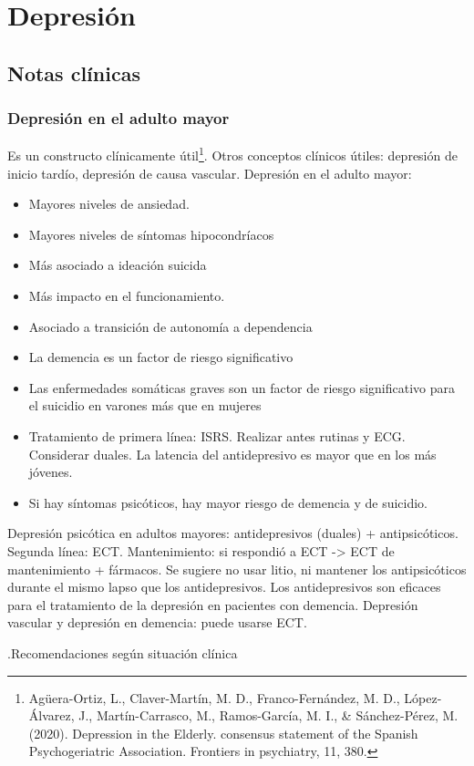 \chapter{Depresión}
\section*{Notas clínicas}
\subsection*{Depresión en el adulto mayor}
Es un constructo clínicamente útil\footnote{Agüera-Ortiz, L., Claver-Martín, M. D., Franco-Fernández, M. D., López-Álvarez, J., Martín-Carrasco, M., Ramos-García, M. I., \& Sánchez-Pérez, M. (2020). Depression in the Elderly. consensus statement of the Spanish Psychogeriatric Association. Frontiers in psychiatry, 11, 380.}.
Otros conceptos clínicos útiles: depresión de inicio tardío, depresión de causa vascular.
Depresión en el adulto mayor:
\begin{itemize}
 \item Mayores niveles de ansiedad.
 \item Mayores niveles de síntomas hipocondríacos
 \item Más asociado a ideación suicida
 \item Más impacto en el funcionamiento.
 \item Asociado a transición de autonomía a dependencia
 \item La demencia es un factor de riesgo significativo
 \item Las enfermedades somáticas graves son un factor de riesgo significativo para el suicidio en varones más que en mujeres
 \item Tratamiento de primera línea: ISRS. Realizar antes rutinas y ECG. Considerar duales. La latencia del antidepresivo es mayor que en los más jóvenes.
 \item Si hay síntomas psicóticos, hay mayor riesgo de demencia y de suicidio.
\end{itemize}
Depresión psicótica en adultos mayores: antidepresivos (duales) + antipsicóticos. Segunda línea: ECT. Mantenimiento: si respondió a ECT -> ECT de mantenimiento + fármacos. Se sugiere no usar litio, ni mantener los antipsicóticos durante el mismo lapso que los antidepresivos.
Los antidepresivos son eficaces para el tratamiento de la depresión en pacientes con demencia.
Depresión vascular y depresión en demencia: puede usarse ECT.

.Recomendaciones según situación clínica


